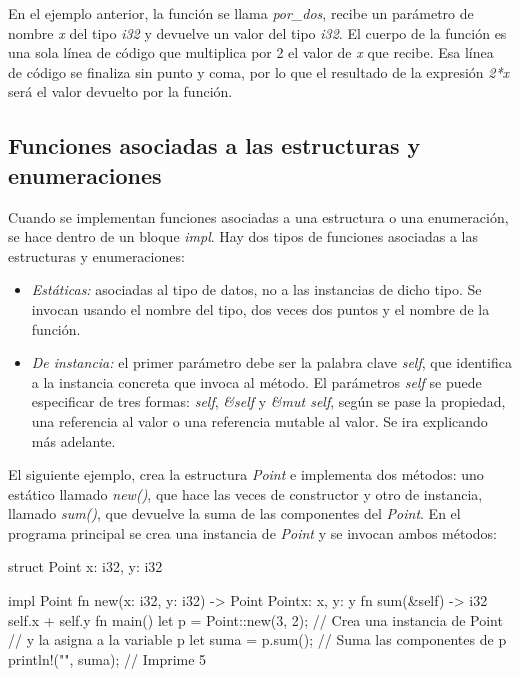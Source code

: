 En el ejemplo anterior, la función se llama \textit{por\_dos}, recibe un parámetro de nombre \textit{x} del tipo \textit{i32} y devuelve un valor del tipo \textit{i32}. El cuerpo de la función es una sola línea de código que multiplica por 2 el valor de \textit{x} que recibe. Esa línea de código se finaliza sin punto y coma, por lo que el resultado de la expresión \textit{2*x} será el valor devuelto por la función.

\subsection{Funciones asociadas a las estructuras y enumeraciones}
Cuando se implementan funciones asociadas a una estructura o una enumeración, se hace dentro de un bloque \textit{impl}. Hay dos tipos de funciones asociadas a las estructuras y enumeraciones:

\begin{itemize}
   \item \textit{Estáticas:} asociadas al tipo de datos, no a las instancias de dicho tipo. Se invocan usando el nombre del tipo, dos veces dos puntos y el nombre de la función.
   \item \textit{De instancia:} el primer parámetro debe ser la palabra clave \textit{self}, que identifica a la instancia concreta que invoca al método. El parámetros \textit{self} se puede especificar de tres formas: \textit{self}, \textit{\&self} y \textit{\&mut self}, según se pase la propiedad, una referencia al valor o una referencia mutable al valor. Se ira explicando más adelante.
\end{itemize}

El siguiente ejemplo, crea la estructura \textit{Point} e implementa dos métodos: uno estático llamado \textit{new()}, que hace las veces de constructor y otro de instancia, llamado \textit{sum()}, que devuelve la suma de las componentes del \textit{Point}. En el programa principal se crea una instancia de \textit{Point} y se invocan ambos métodos:

\vspace{0.7em}
\begin{Codigo}
struct Point {
   x: i32,
   y: i32
}
\end{Codigo}
\begin{Codigo}
impl Point {
   fn new(x: i32, y: i32) -> Point {
      Point{x: x, y: y}
   }
   fn sum(&self) -> i32 {
      self.x + self.y
   }
}
fn main() {
   let p = Point::new(3, 2); // Crea una instancia de Point 
                             // y la asigna a la variable p
   let suma = p.sum();       // Suma las componentes de p
   println!("{}", suma);     // Imprime 5
}
\end{Codigo}

